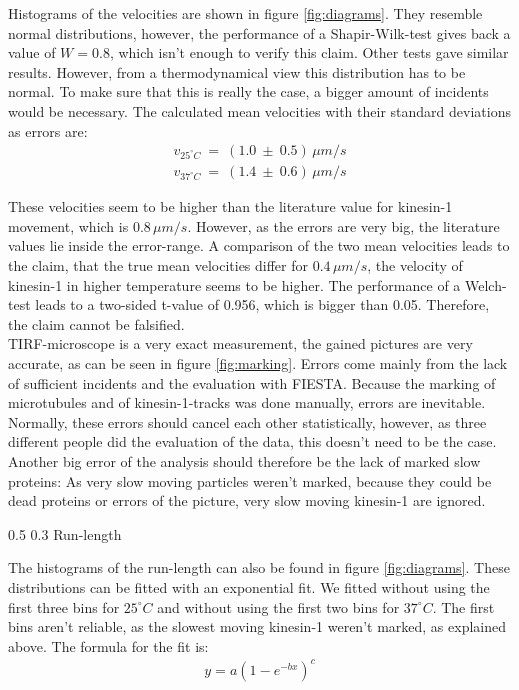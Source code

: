 \documentclass[english, %
parskip=full, %
bibliography=totoc, %
]{scrartcl}
\makeatletter
\renewcommand\subsection{\@startsection 
   {subsection}{2}{0mm}%
   {0.5\baselineskip}%
   {0.3\baselineskip}%
   {\bfseries\sffamily\large}%
   }
\makeatother
\begin{document}
Histograms of the velocities are shown in figure \ref{fig:diagrams}. They resemble normal distributions, however, the performance of a Shapir-Wilk-test gives back a value of $W = 0.8$, which isn't enough to verify this claim. Other tests gave similar results. However, from a thermodynamical view this distribution has to be normal. To make sure that this is really the case, a bigger amount of incidents would be necessary. The calculated mean velocities with their standard deviations as errors are:
\begin{align*}
v _{25^\circ C} \ = \ (1.0 \ \pm \ 0.5) \, \mu m/s \\
v _{37^\circ C} \ = \ (1.4 \ \pm \ 0.6) \, \mu m/s
\end{align*}

These velocities seem to be higher than the literature value for kinesin-1 movement, which is 0.8\,$\mu m/s$. However, as the errors are very big, the literature values lie inside the error-range. A comparison of the two mean velocities leads to the claim, that the true mean velocities differ for $0.4\, \mu m/s$, the velocity of kinesin-1 in higher temperature seems to be higher. The performance of a Welch-test leads to a two-sided t-value of 0.956, which is bigger than 0.05. Therefore, the claim cannot be falsified. \\
TIRF-microscope is a very exact measurement, the gained pictures are very accurate, as can be seen in figure \ref{fig:marking}. Errors come mainly from the lack of sufficient incidents and the evaluation with FIESTA. Because the marking of microtubules and of kinesin-1-tracks was done manually, errors are inevitable. Normally, these errors should cancel each other statistically, however, as three different people did the evaluation of the data, this doesn't need to be the case. Another big error of the analysis should therefore be the lack of marked slow proteins: As very slow moving particles weren't marked, because they could be dead proteins or errors of the picture, very slow moving kinesin-1 are ignored.

\subsection{Run-length}

The histograms of the run-length can also be found in figure \ref{fig:diagrams}. These distributions can be fitted with an exponential fit. We fitted without using the first three bins for $25^\circ C$ and without using the first two bins for $37^\circ C$. The first bins aren't reliable, as the slowest moving kinesin-1 weren't marked, as explained above. The formula for the fit is:
\begin{align*}
y = a (1 - e^{-bx})^c
\end{align*}
\end{document}
